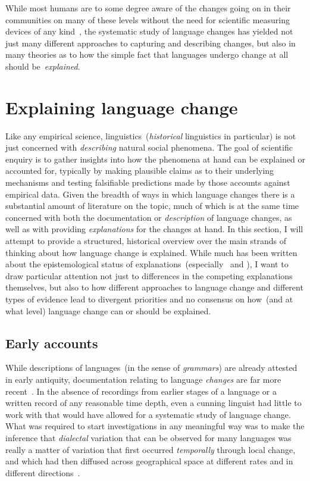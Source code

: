 While most humans are to some degree aware of the changes going on in their communities on many of these levels without the need for scientific measuring devices of any kind~\citep{Labov2001,Tagliamonte2012}, the systematic study of language changes has yielded not just many different approaches to capturing and describing changes, but also in many theories as to how the simple fact that languages undergo change at all should be~\emph{explained}.

\section{Explaining language change}

Like any empirical science, linguistics~(\emph{historical} linguistics in particular) is not just concerned with \emph{describing} natural social phenomena. The goal of scientific enquiry is to gather insights into how the phenomena at hand can be explained or accounted for, typically by making plausible claims as to their underlying mechanisms and testing falsifiable predictions made by those accounts against empirical data. Given the breadth of ways in which language changes there is a substantial amount of literature on the topic, much of which is at the same time concerned with both the documentation or \emph{description} of language changes, as well as with providing \emph{explanations} for the changes at hand.
In this section, I will attempt to provide a structured, historical overview over the main strands of thinking about how language change is explained. While much has been written about the epistemological status of explanations~(especially~\citealt{Lass1980} and \citealt[ch.3]{Newmeyer1998}), I want to draw particular attention not just to differences in the competing explanations themselves, but also to how different approaches to language change and different types of evidence lead to divergent priorities and no consensus on how~(and at what level) language change can or should be explained. 


\subsection{Early accounts}

While descriptions of languages~(in the sense of \emph{grammars}) are already attested in early antiquity, documentation relating to language \emph{changes} are far more recent~\citep{Jespersen1922}. In the absence of recordings from earlier stages of a language or a written record of any reasonable time depth, even a cunning linguist had little to work with that would have allowed for a systematic study of language change. %
What was required to start investigations in any meaningful way was to make the inference that \emph{dialectal} variation that can be observed for many languages was really a matter of variation that first occurred \emph{temporally} through local change, and which had then diffused across geographical space at different rates and in different directions~\citep{Chambers1998}.

